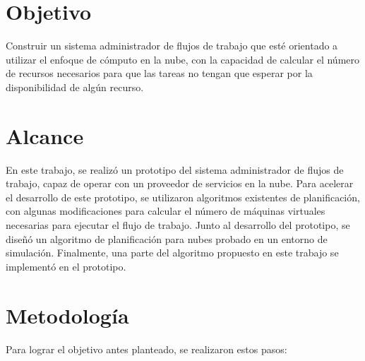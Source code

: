 \section{Objetivo}

Construir un sistema administrador de flujos de trabajo que esté orientado a utilizar el enfoque de cómputo en la nube, con la capacidad de calcular el n\'umero de recursos necesarios para que las tareas no tengan que esperar por la disponibilidad de algún recurso.

\section{Alcance}

En este trabajo, se realiz\'o un prototipo del sistema administrador de flujos de trabajo, capaz de operar con un proveedor de servicios en la nube. Para acelerar el desarrollo de este prototipo, se utilizaron algoritmos existentes de planificaci\'on, con algunas modificaciones para calcular el n\'umero de m\'aquinas virtuales necesarias para ejecutar el flujo de trabajo. Junto al desarrollo del prototipo, se dise\~n\'o un algoritmo de planificaci\'on para nubes probado en un entorno de simulaci\'on. Finalmente, una parte del algoritmo propuesto en este trabajo se implementó en el prototipo.


\section{Metodolog\'ia}

Para lograr el objetivo antes planteado, se realizaron estos pasos:

